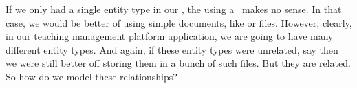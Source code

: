 %
%
%
If we only had a single entity type in our \db, the using a \db\ makes no sense.
In that case, we would be better of using simple documents, like  or  files.
However, clearly, in our teaching management platform application, we are going to have many different entity types.
And again, if these entity types were unrelated, say    then we were still better off storing them in a bunch of such files.
But they are related.
So how do we model these relationships?%
%
%
%
%
\endhsection%
%
